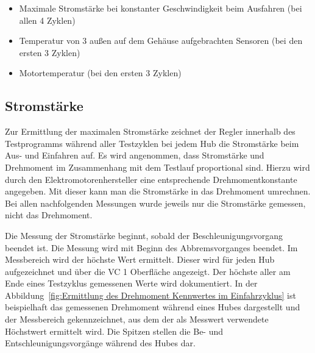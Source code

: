 \begin{itemize}
 \item Maximale Stromstärke bei konstanter Geschwindigkeit beim Ausfahren (bei allen 4 Zyklen)
 \item Temperatur von 3 außen auf dem Gehäuse aufgebrachten Sensoren (bei den ersten 3 Zyklen)
 \item Motortemperatur (bei den ersten 3 Zyklen)
\end{itemize}



\subsection{Stromstärke}\label{ch:Ermittelte_Messwerte_Stromstaerke}

Zur Ermittlung der maximalen Stromstärke zeichnet der Regler innerhalb des Testprogramms während aller Testzyklen bei jedem Hub die Stromstärke beim Aus- und Einfahren auf. Es wird angenommen, dass Stromstärke und Drehmoment im Zusammenhang mit dem Testlauf proportional sind. Hierzu wird  durch den Elektromotorenhersteller eine entsprechende Drehmomentkonstante angegeben. Mit dieser kann man die Stromstärke in das Drehmoment umrechnen. Bei allen nachfolgenden Messungen wurde jeweils nur die Stromstärke gemessen, nicht das Drehmoment.


Die Messung der Stromstärke beginnt, sobald der Beschleunigungsvorgang beendet ist. Die Messung wird mit Beginn des Abbremsvorganges beendet. Im Messbereich wird der höchste Wert ermittelt. Dieser wird für jeden Hub aufgezeichnet und über die VC 1 Oberfläche angezeigt. Der höchste aller am Ende eines Testzyklus gemessenen Werte wird dokumentiert. In der Abbildung~\ref{fig:Ermittlung des Drehmoment Kennwertes im Einfahrzyklus} ist beispielhaft das gemessenen Drehmoment während eines Hubes dargestellt und der Messbereich gekennzeichnet, aus dem der als Messwert verwendete Höchstwert ermittelt wird. Die Spitzen stellen die Be- und Entschleunigungsvorgänge während des Hubes dar.




